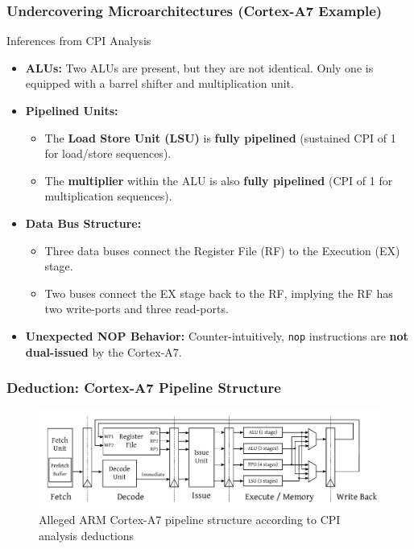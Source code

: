 \begin{frame}
    \frametitle{Undercovering Microarchitectures (Cortex-A7 Example)}
    \begin{block}{Inferences from CPI Analysis}
        \begin{itemize}
            \item \textbf{ALUs:} Two ALUs are present, but they are not identical. Only one is equipped with a barrel shifter and multiplication unit.
            \item \textbf{Pipelined Units:}
                \begin{itemize}
                    \item The \textbf{Load Store Unit (LSU)} is \textbf{fully pipelined} (sustained CPI of 1 for load/store sequences).
                    \item The \textbf{multiplier} within the ALU is also \textbf{fully pipelined} (CPI of 1 for multiplication sequences).
                \end{itemize}
            \item \textbf{Data Bus Structure:}
                \begin{itemize}
                    \item Three data buses connect the Register File (RF) to the Execution (EX) stage.
                    \item Two buses connect the EX stage back to the RF, implying the RF has two write-ports and three read-ports.
                \end{itemize}
            \item \textbf{Unexpected NOP Behavior:} Counter-intuitively, \texttt{nop} instructions are \textbf{not dual-issued} by the Cortex-A7.
        \end{itemize}
    \end{block}
\end{frame}



\begin{frame}
    \frametitle{Deduction: Cortex-A7 Pipeline Structure}
    \begin{figure}
        \centering
        \includegraphics[width=1.0\textwidth]{Pictures/cortexUncovered.png}
        \caption{Alleged ARM Cortex-A7 pipeline structure according to CPI analysis deductions }
        \label{fig:deduced-pipeline}
    \end{figure}
\end{frame}



